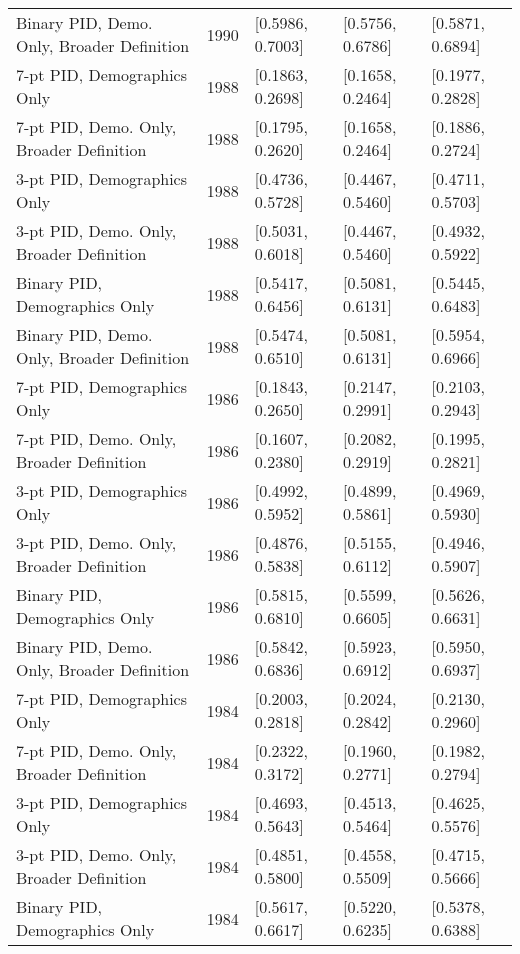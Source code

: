 \begin{longtable}{lrlll}
  Binary PID, Demo. Only, Broader Definition & 1990 & [0.5986, 0.7003] & [0.5756, 0.6786] & [0.5871, 0.6894] \\ 
  7-pt PID, Demographics Only & 1988 & [0.1863, 0.2698] & [0.1658, 0.2464] & [0.1977, 0.2828] \\ 
  7-pt PID, Demo. Only, Broader Definition & 1988 & [0.1795, 0.2620] & [0.1658, 0.2464] & [0.1886, 0.2724] \\ 
  3-pt PID, Demographics Only & 1988 & [0.4736, 0.5728] & [0.4467, 0.5460] & [0.4711, 0.5703] \\ 
  3-pt PID, Demo. Only, Broader Definition & 1988 & [0.5031, 0.6018] & [0.4467, 0.5460] & [0.4932, 0.5922] \\ 
  Binary PID, Demographics Only & 1988 & [0.5417, 0.6456] & [0.5081, 0.6131] & [0.5445, 0.6483] \\ 
  Binary PID, Demo. Only, Broader Definition & 1988 & [0.5474, 0.6510] & [0.5081, 0.6131] & [0.5954, 0.6966] \\ 
  7-pt PID, Demographics Only & 1986 & [0.1843, 0.2650] & [0.2147, 0.2991] & [0.2103, 0.2943] \\ 
  7-pt PID, Demo. Only, Broader Definition & 1986 & [0.1607, 0.2380] & [0.2082, 0.2919] & [0.1995, 0.2821] \\ 
  3-pt PID, Demographics Only & 1986 & [0.4992, 0.5952] & [0.4899, 0.5861] & [0.4969, 0.5930] \\ 
  3-pt PID, Demo. Only, Broader Definition & 1986 & [0.4876, 0.5838] & [0.5155, 0.6112] & [0.4946, 0.5907] \\ 
  Binary PID, Demographics Only & 1986 & [0.5815, 0.6810] & [0.5599, 0.6605] & [0.5626, 0.6631] \\ 
  Binary PID, Demo. Only, Broader Definition & 1986 & [0.5842, 0.6836] & [0.5923, 0.6912] & [0.5950, 0.6937] \\ 
  7-pt PID, Demographics Only & 1984 & [0.2003, 0.2818] & [0.2024, 0.2842] & [0.2130, 0.2960] \\ 
  7-pt PID, Demo. Only, Broader Definition & 1984 & [0.2322, 0.3172] & [0.1960, 0.2771] & [0.1982, 0.2794] \\ 
  3-pt PID, Demographics Only & 1984 & [0.4693, 0.5643] & [0.4513, 0.5464] & [0.4625, 0.5576] \\ 
  3-pt PID, Demo. Only, Broader Definition & 1984 & [0.4851, 0.5800] & [0.4558, 0.5509] & [0.4715, 0.5666] \\ 
  Binary PID, Demographics Only & 1984 & [0.5617, 0.6617] & [0.5220, 0.6235] & [0.5378, 0.6388] \\ 

\end{longtable}
